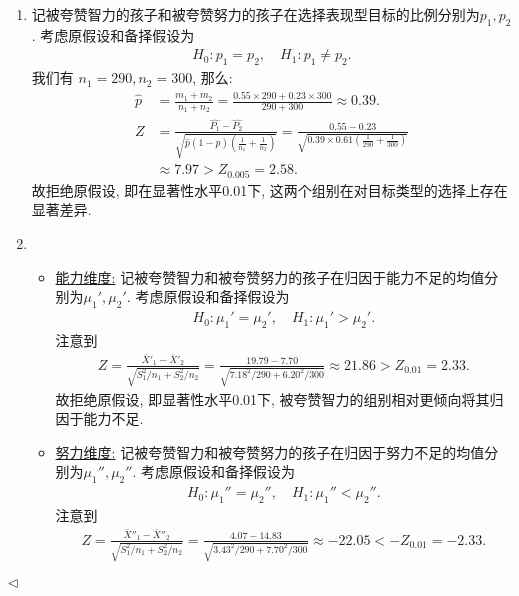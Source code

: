 \documentclass[11pt]{article}
\newenvironment{answer}[1][Solution]{\begin{trivlist}
\item[\hskip \labelsep {\bfseries #1.}\hskip \labelsep]}{\hfill$\lhd$\end{trivlist}}
\newcommand\1{\mathds{1}}
\begin{document}
\begin{answer}
    \begin{enumerate}[label=(\arabic*)]
        \item 记被夸赞智力的孩子和被夸赞努力的孩子在选择表现型目标的比例分别为$p_1, p_2$. 考虑原假设和备择假设为
        \begin{align*}
            H_0: p_1 = p_2, \quad H_1: p_1 \neq p_2.
        \end{align*}
        我们有 $n_1 = 290, n_2 = 300$, 那么:
        \begin{align*}
            \widehat{p} &= \frac{m_1 + m_2}{n_1 + n_2} = \frac{0.55\times 290 + 0.23 \times 300}{290 + 300} \approx 0.39. \\
            Z &= \frac{\widehat{P_1} - \widehat{P_2}}{\sqrt{\widehat{p}(1-\widehat{p})\left(\frac{1}{n_1} + \frac{1}{n_2}\right)}} = \frac{0.55 - 0.23}{\sqrt{0.39\times 0.61\left(\frac{1}{290} + \frac{1}{300}\right)}} \\
            &\approx 7.97 > Z_{0.005} = 2.58.
        \end{align*}
        故拒绝原假设, 即在显著性水平0.01下, 这两个组别在对目标类型的选择上存在显著差异.
        \item \begin{itemize}
            \item \underline{能力维度:} 记被夸赞智力和被夸赞努力的孩子在归因于能力不足的均值分别为$\mu_{1}', \mu_2'$. 考虑原假设和备择假设为
            \begin{align*}
                H_0: \mu_1' = \mu_2', \quad H_1: \mu_1' > \mu_2'.
            \end{align*}
            注意到
            \begin{align*}
                Z = \frac{\bar{X}'_1 - \bar{X}'_2}{\sqrt{S_1^2/n_1 +S_2^2/n_2}} = \frac{19.79 - 7.70}{\sqrt{7.18^2/290 + 6.20^2/300}} \approx 21.86 > Z_{0.01} = 2.33.
            \end{align*}
            故拒绝原假设, 即显著性水平0.01下, 被夸赞智力的组别相对更倾向将其归因于能力不足.
            \item \underline{努力维度:} 记被夸赞智力和被夸赞努力的孩子在归因于努力不足的均值分别为$\mu_{1}'', \mu_2''$. 考虑原假设和备择假设为
            \begin{align*}
                H_0: \mu_1'' = \mu_2'', \quad H_1: \mu_1'' < \mu_2''.
            \end{align*}
            注意到
            \begin{align*}
                Z = \frac{\bar{X}''_1 - \bar{X}''_2}{\sqrt{S_1^2/n_1 +S_2^2/n_2}} =  \frac{4.07 - 14.83}{\sqrt{3.43^2/290 + 7.70^2/300}} \approx -22.05 < -Z_{0.01} = -2.33.

\end{align*}
\end{itemize}
\end{enumerate}
\end{answer}
\end{document}
